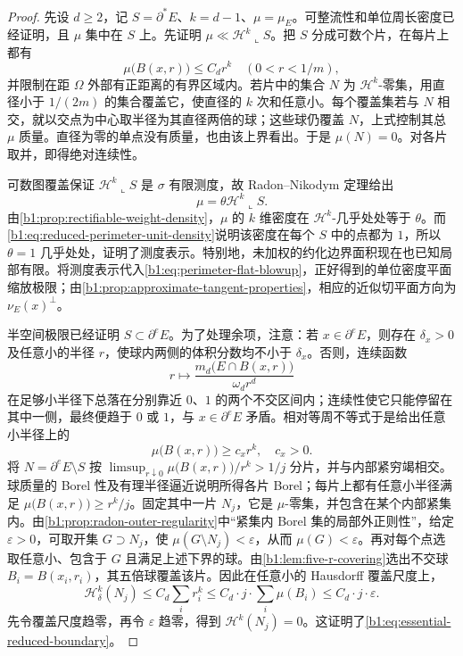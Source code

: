 \begin{proof}
先设 \(d\ge2\)，记 \(S=\partial^*E\)、\(k=d-1\)、\(\mu=\mu_E\)。可整流性和单位周长密度已经证明，且 \(\mu\) 集中在 \(S\) 上。先证明 \(\mu\ll\mathcal H^k\llcorner S\)。把 \(S\) 分成可数个片，在每片上都有
\[
 \mu\bigl(B(x,r)\bigr)\le C_dr^k\quad(0<r<1/m),
\]
并限制在距 \(\Omega\) 外部有正距离的有界区域内。若片中的集合 \(N\) 为 \(\mathcal H^k\)-零集，用直径小于 \(1/(2m)\) 的集合覆盖它，使直径的 \(k\) 次和任意小。每个覆盖集若与 \(N\) 相交，就以交点为中心取半径为其直径两倍的球；这些球仍覆盖 \(N\)，上式控制其总 \(\mu\) 质量。直径为零的单点没有质量，也由该上界看出。于是 \(\mu(N)=0\)。对各片取并，即得绝对连续性。

可数图覆盖保证 \(\mathcal H^k\llcorner S\) 是 \(\sigma\) 有限测度，故 Radon–Nikodym 定理给出
\[
 \mu=\theta\mathcal H^k\llcorner S.
\]
由\cref{b1:prop:rectifiable-weight-density}，\(\mu\) 的 \(k\) 维密度在 \(\mathcal H^k\)-几乎处处等于 \(\theta\)。而\eqref{b1:eq:reduced-perimeter-unit-density}说明该密度在每个 \(S\) 中的点都为 \(1\)，所以 \(\theta=1\) 几乎处处，证明了测度表示。特别地，未加权的约化边界面积现在也已知局部有限。将测度表示代入\eqref{b1:eq:perimeter-flat-blowup}，正好得到的单位密度平面缩放极限；由\cref{b1:prop:approximate-tangent-properties}，相应的近似切平面方向为 \(\nu_E(x)^\perp\)。

半空间极限已经证明 \(S\subset\partial^eE\)。为了处理余项，注意：若 \(x\in\partial^eE\)，则存在 \(\delta_x>0\) 及任意小的半径 \(r\)，使球内两侧的体积分数均不小于 \(\delta_x\)。否则，连续函数
\[
 r\longmapsto\frac{m_d\bigl(E\cap B(x,r)\bigr)}{\omega_dr^d}
\]
在足够小半径下总落在分别靠近 \(0\)、\(1\) 的两个不交区间内；连续性使它只能停留在其中一侧，最终便趋于 \(0\) 或 \(1\)，与 \(x\in\partial^eE\) 矛盾。相对等周不等式于是给出任意小半径上的
\[
 \mu\bigl(B(x,r)\bigr)\ge c_xr^k,\quad c_x>0.
\]
将 \(N=\partial^eE\setminus S\) 按
\(\limsup_{r\downarrow0}\mu\bigl(B(x,r)\bigr)/r^k>1/j\)
分片，并与内部紧穷竭相交。球质量的 Borel 性及有理半径逼近说明所得各片 Borel；每片上都有任意小半径满足 \(\mu\bigl(B(x,r)\bigr)\ge r^k/j\)。固定其中一片 \(N_j\)，它是 \(\mu\)-零集，并包含在某个内部紧集内。由\cref{b1:prop:radon-outer-regularity}中“紧集内 Borel 集的局部外正则性”，给定 \(\varepsilon>0\)，可取开集 \(G\supset N_j\)，使 \(\mu(G\setminus N_j)<\varepsilon\)，从而 \(\mu(G)<\varepsilon\)。再对每个点选取任意小、包含于 \(G\) 且满足上述下界的球。由\cref{b1:lem:five-r-covering}选出不交球 \(B_i=B(x_i,r_i)\)，其五倍球覆盖该片。因此在任意小的 Hausdorff 覆盖尺度上，
\[
 \mathcal H^k_{\delta}(N_j)
 \le C_d\sum_i r_i^k
 \le C_d\cdot j\cdot\sum_i\mu(B_i)
 \le C_d\cdot j\cdot\varepsilon.
\]
先令覆盖尺度趋零，再令 \(\varepsilon\) 趋零，得到 \(\mathcal H^k(N_j)=0\)。这证明了\eqref{b1:eq:essential-reduced-boundary}。


\end{proof}
